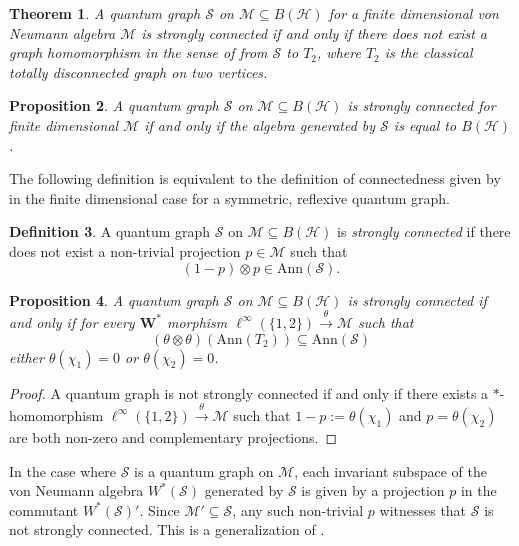 \documentclass[12pt]{article}
\newtheorem{theorem}{Theorem}[section]
\newtheorem{proposition}[theorem]{Proposition}
\theoremstyle{definition}
\newtheorem{definition}[theorem]{Definition}
\newenvironment{remark}
  {\pushQED{\qed}\renewcommand{\qedsymbol}{\textcircled{\tiny R}}\remarkx}
  {\popQED\endremarkx}
\newcommand{\mc}[1]{\mathcal{#1}}
\newcommand{\<}{\langle}
\renewcommand{\>}{\rangle}
\newcommand{\Ann}{\text{Ann}}
\renewcommand{\subset}{\subseteq}
\begin{document}
\begin{theorem} 
    A quantum graph $\mc S$ on $\mc M \subset B(\mc H)$ for a finite dimensional von Neumann algebra $\mc M$ is \textit{strongly connected} if and only if there does not exist a graph homomorphism in the sense of \cite[Proposition 5.3]{musto-reutter-verdon} from $\mc S$ to $T_2$, where $T_2$ is the classical totally disconnected graph on two vertices. 
\end{theorem}

\begin{proposition} 
    A quantum graph $\mc S$ on $\mc M \subset B(\mc H)$ is \textit{strongly connected} for finite dimensional $\mc M$ if and only if the algebra generated by $\mc S$ is equal to $B(\mc H)$. 
\end{proposition}

The following definition is equivalent to the definition of connectedness given by \cite[Definition 3.2]{jun-alg-connect} in the finite dimensional case for a symmetric, reflexive quantum graph.

\begin{definition} \label{defn: connected}
    A quantum graph $\mc S$ on $\mc M \subset B(\mc H)$ is \textit{strongly connected} if there does not exist a non-trivial projection $p \in \mc M$ such that 
    \[
    (1-p) \otimes p \in \Ann(\mc S).
    \]
\end{definition}

\begin{proposition}
    A quantum graph $\mc S$ on $\mc M \subset B(\mc H)$ is \textit{strongly connected} if and only if for every $\mathbf{W^*}$ morphism $\ell^\infty(\{1,2\}) \overset{\theta}{\to} \mc M$ such that 
     \[
     (\theta \otimes \theta )(\Ann(T_2)) \subseteq \Ann(\mc S)
     \]
    either $\theta(\chi_1) = 0$ or $\theta(\chi_2) = 0$.
\end{proposition}
\begin{proof}
    A quantum graph is not strongly connected if and only if there exists a $*$-homomorphism $\ell^\infty(\{1,2\}) \overset{\theta}{\to} \mc M$ such that $1 - p := \theta(\chi_1)$ and $p = \theta(\chi_2)$ are both non-zero and complementary projections.
\end{proof}

\begin{remark}
    In the case where $\mc S$ is a quantum graph on $\mc M$, each invariant subspace of the von Neumann algebra $W^*(\mc S)$ generated by $\mc S$ is given by a projection $p$ in the commutant $W^*(\mc S)'$. Since $\mc M' \subset \mc S$, any such non-trivial $p$ witnesses that $\mc S$ is not strongly connected. This is a generalization of \cite[Theorem 3.4(4)]{connected-qgraphs}.
\end{remark}
\end{document}

